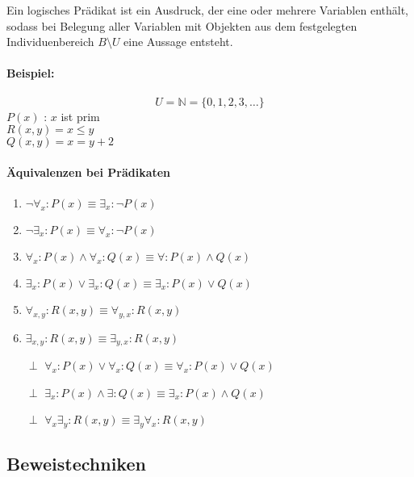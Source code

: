 \begin{defi}[Prädikat]
\glqq Ein logisches Prädikat ist ein Ausdruck, der eine oder mehrere Variablen enthält, sodass bei Belegung aller Variablen mit Objekten aus dem festgelegten Individuenbereich $B\setminus U$ eine Aussage entsteht.\grqq
\end{defi}
\paragraph{Beispiel:}
\[
U=\mathbb{N}=\{0,1,2,3,\ldots\}
\]
$P(x)$ : \glq $x$ ist prim\grq \\
$R(x,y) = $\glq$x \leq y$\grq \\
$Q(x,y) = $\glq$x=y+2$\grq

\paragraph{Äquivalenzen bei Prädikaten}
\begin{enumerate}
\item $\neg \forall_x : P(x) \equiv \exists_x: \neg P(x)$
\item $\neg \exists_x : P(x) \equiv \forall_x: \neg P(x)$
\item $\forall_x : P(x) \land \forall_x : Q(x) \equiv \forall : P(x) \land Q(x)$
\item $\exists_x : P(x) \lor \exists_x : Q(x) \equiv \exists_x : P(x) \lor Q(x)$
\item $\forall_{x,y} : R(x,y) \equiv \forall_{y,x} : R(x,y)$
\item $\exists_{x,y} : R(x,y) \equiv \exists_{y,x} : R(x,y)$
\item[$\perp$] $\forall_x : P(x) \lor \forall_x:Q(x) \equiv \forall_x : P(x) \lor Q(x)$
\item[$\perp$] $\exists_x : P(x) \land \exists : Q(x) \equiv \exists_x : P(x) \land Q(x)$
\item[$\perp$] $\forall_x \exists_y : R(x,y) \equiv \exists_y \forall_x : R(x,y)$
\end{enumerate}

\subsection{Beweistechniken}

